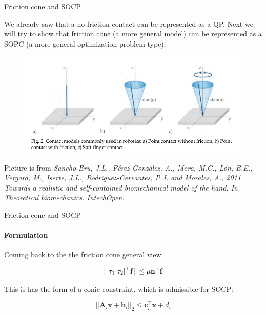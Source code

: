 \documentclass{beamer}
\begin{document}
\begin{frame}{Friction cone and SOCP}
\begin{flushleft}

We already saw that a no-friction contact can be represented as a QP. Next we will try to show that friction cone (a more general model) can be represented as a SOPC (a more general optimization problem type).

\begin{figure}
    \centering
    \includegraphics[width= 0.85\linewidth]{fig2.png}
    \label{fig:contact}
\end{figure}

\scriptsize{Picture is from \emph{Sancho-Bru, J.L., P\'{e}rez-Gonz\'{a}lez, A., Mora, M.C., L\'{o}n, B.E., Vergara, M., Iserte, J.L., Rodriguez-Cervantes, P.J. and Morales, A., 2011. Towards a realistic and self-contained biomechanical model of the hand. In Theoretical biomechanics. IntechOpen.}}

\end{flushleft}
\end{frame}



\begin{frame}{Friction cone and SOCP}
\framesubtitle{Formulation}
\begin{flushleft}

Coming back to the the friction cone general view:

\begin{equation}
    || [\tau_1 \ \tau_2]^\top \mathbf{f} || \leq \mu \mathbf{n}^\top \mathbf{f}
\end{equation}

This is has the form of a conic constraint, which is admissible for SOCP:

\begin{equation}
    ||\mathbf{A}_i\mathbf{x} + \mathbf{b}_i||_2 \leq 
     \mathbf{c}_i^\top \mathbf{x} + d_i
\end{equation}


\end{flushleft}
\end{frame}
\end{document}
